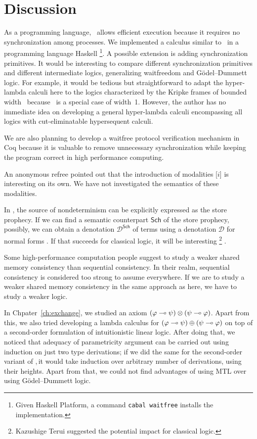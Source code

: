 \section{Discussion}
\label{future}

As a programming language, \lgd\, allows efficient execution because it
requires no synchronization among processes.
We implemented a calculus similar to \lgd\, in a programming language
Haskell%
\footnote{Given Haskell Platform, a command \texttt{cabal
waitfree} installs the implementation.}.
A possible extension is adding synchronization primitives.
It would be interesting to compare different synchronization primitives
and different intermediate logics, generalizing waitfreedom and
G\"odel--Dummett logic.
For example, it would be tedious but straightforward to adapt the
hyper-lambda calculi here to
the logics characterized by the Kripke frames of bounded
width~\citep{Ciabattoni01042001} because \lgd\, is a special case of
width~1.  However, the author has no immediate idea on
developing a general hyper-lambda calculi encompassing
all logics with cut-eliminatable hypersequent calculi.

We are also planning to develop a waitfree protocol verification mechanism in Coq
because it is valuable to
remove unnecessary synchronization while keeping the program correct
in high performance computing.

An anonymous refree pointed out that the introduction of
modalities [$i$] is interesting on its own.
We have not investigated the semantics of these modalities.


In \lgd, the source of nondeterminism can be explicitly expressed as the
store prophecy.
If we can find a semantic counterpart $\mathsf{Sch}$ of the store
prophecy, possibly, we
can obtain a denotation $\mathcal{D}^\mathsf{Sch}$ of terms
using a denotation $\mathcal{D}$ for normal forms%
.
If that succeeds for classical logic, it will be interesting%
\footnote{Kazushige Terui suggested the potential impact for classical logic.}%
.

Some high-performance computation people suggest to study a weaker
shared memory consistency than sequential consistency.
In their realm, sequential consistency is considered too strong to
assume everywhere.  If we are to study a weaker shared memory
consistency in the same approach as here,
we have to study a weaker logic.

In Chpater~\ref{ch:exchange}, we studied an axiom
$(\varphi\multimap\psi)\otimes(\psi\multimap\varphi)$.
Apart from this, we also tried developing a lambda calculus for
$(\varphi\multimap\psi)\oplus(\psi\multimap\varphi)$ on top of a second-order
formulation of intuitionistic linear logic.
After doing that, we noticed that adequacy of parametricity argument
can be carried out using induction on just two type derivations;
if we did the same for the second-order variant of \lgd,\,it would take
induction over arbitrary number of derivations, using their heights.
Apart from that, we could not find advantages of using MTL over
using G\"odel--Dummett logic.

